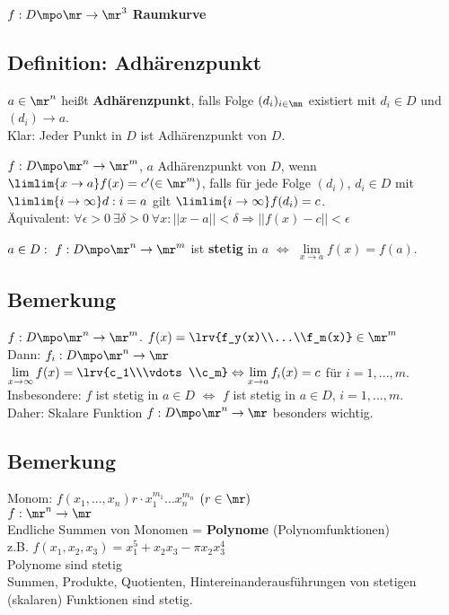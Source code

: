 		$ f:D\mpo\mr\rightarrow\mr^3 $ \textbf{Raumkurve}
	\subExEnd

\subsection{Definition: Adhärenzpunkt}
		\item $ a\in\mr^n $ heißt \textbf{Adhärenzpunkt}, falls Folge $ (d_i)_{i\in\mn} $ existiert mit $ d_i\in D $ und $ (d_i)\rightarrow a $.\\
		Klar: Jeder Punkt in $ D $ ist Adhärenzpunkt von $ D $.
		
		\item $ f:D\mpo\mr^n\rightarrow\mr^m $, $ a $ Adhärenzpunkt von $ D $, wenn $ \limlim{x\rightarrow a}f(x)=c'(\in\mr^m) $, falls für jede Folge $ (d_i) $, $ d_i\in D $ mit $ \limlim{i\rightarrow\infty}d:i=a $ gilt $ \limlim{i\rightarrow\infty}f(d_i)=c $.\\
		Äquivalent: $ \forall\epsilon >0\ \exists\delta>0\ \forall x:||x-a||<\delta\Rightarrow||f(x)-c||<\epsilon $
		
		\item $ a\in D:\ f:D\mpo\mr^n\rightarrow\mr^m $ ist \textbf{stetig} in $ a $ $ \Leftrightarrow $ $ \lim\limits_{x\rightarrow a}f(x)=f(a) $.
	\subExEnd

\subsection{Bemerkung}
	$ f:D\mpo\mr^n\rightarrow\mr^m $. $ f(x)=\lrv{f_y(x)\\...\\f_m(x)}\in\mr^m$\\
	Dann: $ f_i:D\mpo\mr^n\rightarrow\mr $\\
	$ \lim\limits_{x\rightarrow\infty}f(x)=\lrv{c_1\\\vdots\\c_m}\Leftrightarrow\lim\limits_{x\rightarrow a}f_i(x)=c $ für $ i=1,...,m $.\\
	Insbesondere: $ f $ ist stetig in $ a\in D $ $ \Leftrightarrow $ $ f $ ist stetig in $ a\in D $, $ i=1,...,m $.\\
	Daher: Skalare Funktion $ f:D\mpo\mr^n\rightarrow\mr $ besonders wichtig.
	
\subsection{Bemerkung}
	Monom: $ f(x_1,...,x_n)r\cdot x_1^{m_1}...x_n^{m_n} $ $ (r\in\mr) $\\
	$ f:\mr^n\rightarrow\mr $\\
	Endliche Summen von Monomen = \textbf{Polynome} (Polynomfunktionen)\\
	z.B. $ f(x_1,x_2,x_3)=x_1^5+x_2x_3-\pi x_2x_3^4 $\\
	Polynome sind stetig\\
	Summen, Produkte, Quotienten, Hintereinanderausführungen von stetigen (skalaren) Funktionen sind stetig.
	
